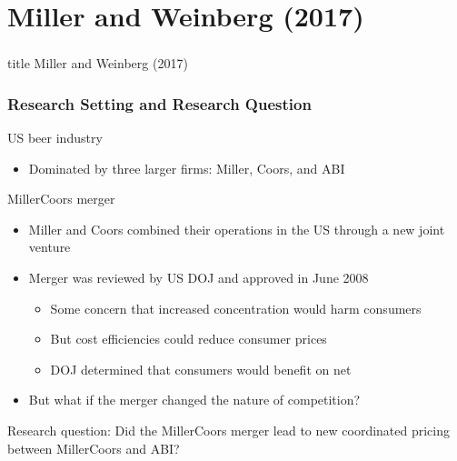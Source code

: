\documentclass{beamer}
\begin{document}
\section{Miller and Weinberg (2017)}
\label{mw}
\begin{frame}\frametitle{}
    \vfill
    \centering
    \begin{beamercolorbox}[center]{title}
        \Large Miller and Weinberg (2017)
    \end{beamercolorbox}
    \vfill
\end{frame}

\begin{frame}\frametitle{Research Setting and Research Question}
    US beer industry
    \begin{itemize}
        \item Dominated by three larger firms: Miller, Coors, and ABI
    \end{itemize}
    \vspace{2ex}
    MillerCoors merger
    \begin{itemize}
        \item Miller and Coors combined their operations in the US through a new joint venture
        \item Merger was reviewed by US DOJ and approved in June 2008
        \begin{itemize}
            \item Some concern that increased concentration would harm consumers
            \item But cost efficiencies could reduce consumer prices
            \item DOJ determined that consumers would benefit on net
        \end{itemize}
        \item But what if the merger changed the nature of competition?
    \end{itemize}
    \vspace{2ex}
    Research question: Did the MillerCoors merger lead to new coordinated pricing between MillerCoors and ABI?
\end{frame}
\end{document}
